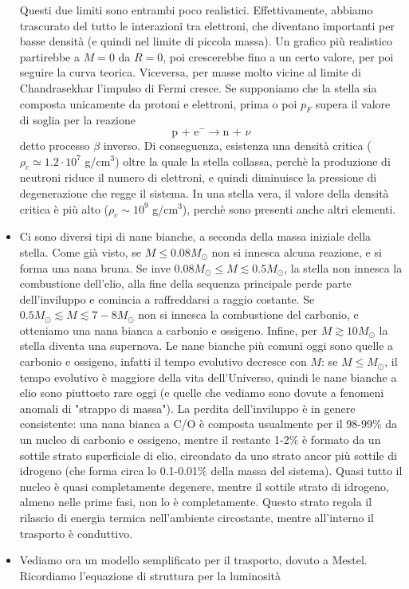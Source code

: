 \documentclass[a4paper,11pt]{article}
\newcommand{\s}{_\odot}
\theoremstyle{theorem}
\theoremstyle{definition}
\begin{document}
\begin{itemize}
		\noindent Questi due limiti sono entrambi poco realistici. Effettivamente, abbiamo trascurato del tutto le interazioni tra elettroni, che diventano importanti per basse densità (e quindi nel limite di piccola massa). Un grafico più realistico partirebbe a $M=0$ da $R=0$, poi crescerebbe fino a un certo valore, per poi seguire la curva teorica. Viceversa, per masse molto vicine al limite di Chandrasekhar l'impulso di Fermi cresce. Se supponiamo che la stella sia composta unicamente da protoni e elettroni, prima o poi $p_F$ supera il valore di soglia per la reazione
		\[\textrm{p + e}^-\to \textrm{n + }\nu\]
		detto processo $\beta$ inverso. Di conseguenza, esistenza una densità critica ($\rho_c\simeq 1.2\cdot10^7$ g/cm$^3$) oltre la quale la stella collassa, perchè la produzione di neutroni riduce il numero di elettroni, e quindi diminuisce la pressione di degenerazione che regge il sistema. In una stella vera, il valore della densità critica è più alto ($\rho_c\sim10^9$ g/cm$^3$), perchè sono presenti anche altri elementi.
		\item Ci sono diversi tipi di nane bianche, a seconda della massa iniziale della stella. Come già visto, se $M\leq 0.08M\s$ non si innesca alcuna reazione, e si forma una nana bruna. Se inve $0.08M\s\leq M\lesssim0.5M\s$, la stella non innesca la combustione dell'elio, alla fine della sequenza principale perde parte dell'inviluppo e comincia a raffreddarsi a raggio costante. Se $0.5M\s\lesssim M\lesssim 7-8M\s$ non si innesca la combustione del carbonio, e otteniamo una nana bianca a carbonio e ossigeno. Infine, per $M\gtrsim 10M\s$ la stella diventa una supernova. Le nane bianche più comuni oggi sono quelle a carbonio e ossigeno, infatti il tempo evolutivo decresce con $M$: se $M\leq M\s$, il tempo evolutivo è maggiore della vita dell'Universo, quindi le nane bianche a elio sono piuttosto rare oggi (e quelle che vediamo sono dovute a fenomeni anomali di "strappo di massa"). La perdita dell'inviluppo è in genere consistente: una nana bianca a C/O è composta usualmente per il 98-99\% da un nucleo di carbonio e ossigeno, mentre il restante 1-2\% è formato da un sottile strato superficiale di elio, circondato da uno strato ancor più sottile di idrogeno (che forma circa lo 0.1-0.01\% della massa del sistema). Quasi tutto il nucleo è quasi completamente degenere, mentre il sottile strato di idrogeno, almeno nelle prime fasi, non lo è completamente. Questo strato regola il rilascio di energia termica nell'ambiente circostante, mentre all'interno il trasporto è conduttivo.
		\item Vediamo ora un modello semplificato per il trasporto, dovuto a Mestel. Ricordiamo l'equazione di struttura per la luminosità

\end{itemize}
\end{document}
